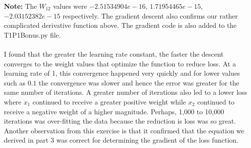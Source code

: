 \documentclass[submit]{harvardml}
\begin{document}
\begin{tcolorbox}[breakable]
\textbf{Note:} The $W_{12}$ values were  $ -2.51534904e-16$, $1.71954465e-15$, $-2.03152382e-15$ respectively. The gradient descent also confirms our rather complicated derivative function above. The gradient code is also added to the T1P1Bonus.py file.\\\\

I found that the greater the learning rate constant, the faster the descent converges to the weight values that optimize the function to reduce loss. At a learning rate of 1, this convergence happened very quickly and for lower values such as $0.1$ the convergence was slower and hence the error was greater for the same number of iterations. A greater number of iterations also led to a lower loss where $x_1$ continued to receive a greater positive weight while $x_2$ continued to receive a negative weight of a higher magnitude. Perhaps, 1,000 to 10,000 iterations was over-fitting the data because the reduction is loss was so great. Another observation from this exercise is that it confirmed that the equation we derived in part 3 was correct for determining the gradient of the loss function.

\end{tcolorbox}


\newpage

\end{document}
